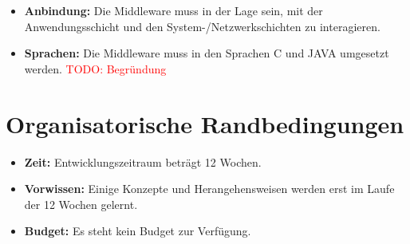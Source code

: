 \begin{itemize}
\begin{itemize}
\begin{itemize}
    	\end{itemize}
    \end{itemize}
    \item \textbf{Anbindung:} Die Middleware muss in der Lage sein, mit der Anwendungsschicht und den System-/Netzwerkschichten zu interagieren.
    \item \textbf{Sprachen:} Die Middleware muss in den Sprachen C und JAVA umgesetzt werden. \textcolor{red}{TODO: Begründung}

    
\end{itemize}

\section{Organisatorische Randbedingungen}
\begin{itemize}
    \item \textbf{Zeit:} Entwicklungszeitraum beträgt 12 Wochen. 
    \item \textbf{Vorwissen:} Einige Konzepte und Herangehensweisen werden erst im Laufe der 12 Wochen gelernt.
    \item \textbf{Budget:} Es steht kein Budget zur Verfügung.

\end{itemize}



